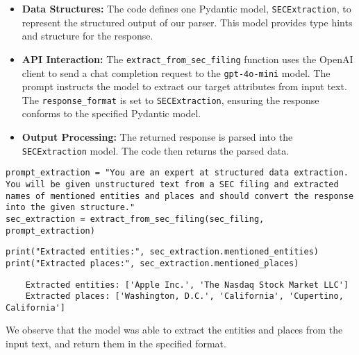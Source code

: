 \begin{itemize}
    \item \textbf{Data Structures:} The code defines one Pydantic model, \texttt{SECExtraction}, to represent the structured output of our parser. This model provides type hints and structure for the response.
    \item \textbf{API Interaction:} The \texttt{extract\_from\_sec\_filing} function uses the OpenAI client to send a chat completion request to the \texttt{gpt-4o-mini} model. The prompt instructs  the model to extract our target attributes from input text. The \texttt{response\_format} is set to \texttt{SECExtraction}, ensuring the response conforms to the specified Pydantic model.
    \item \textbf{Output Processing:} The returned response is parsed into the \texttt{SECExtraction} model. The code then returns the parsed data.
\end{itemize}

\begin{verbatim}
prompt_extraction = "You are an expert at structured data extraction. You will be given unstructured text from a SEC filing and extracted names of mentioned entities and places and should convert the response into the given structure."
sec_extraction = extract_from_sec_filing(sec_filing, prompt_extraction)
\end{verbatim}


\begin{verbatim}
print("Extracted entities:", sec_extraction.mentioned_entities)
print("Extracted places:", sec_extraction.mentioned_places)
\end{verbatim}

\begin{verbatim}
    Extracted entities: ['Apple Inc.', 'The Nasdaq Stock Market LLC']
    Extracted places: ['Washington, D.C.', 'California', 'Cupertino, California']
\end{verbatim}


We observe that the model was able to extract the entities and places from the input text, and return them in the specified format.

